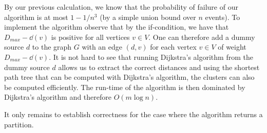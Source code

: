 By our previous calculation, we know that the probability of failure of our algorithm is at most $1-1/n^3$ (by a simple union bound over $n$ events).  To implement the algorithm observe that by the if-condition, we have that $D_{max} - \dd(v)$ is positive for all vertices $v \in V$.  One can therefore add a dummy source $d$ to the graph $G$ with an edge $(d,v)$ for each vertex $v \in V$ of weight $D_{max} - \dd(v)$. It is not hard to see that running Dijkstra's algorithm from the dummy source $d$ allows us to extract the correct distances and using the shortest path tree that can be computed with Dijkstra's algorithm, the clusters can also be computed efficiently.  The run-time of the algorithm is then dominated by Dijkstra's algorithm and therefore $O(m \log n)$. 

It only remains to establish correctness for the case where the algorithm returns a partition.

